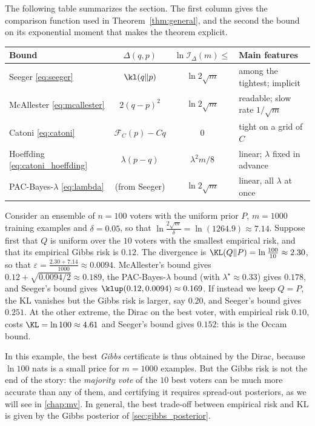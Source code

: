 The following table summarizes the section. The first column gives the
comparison function used in Theorem~\ref{thm:general}, and the second the bound
on its exponential moment that makes the theorem explicit.

\begin{center}
\renewcommand{\arraystretch}{1.3}
\small
\begin{tabular}{lccp{4.2cm}}
\toprule
Bound & $\Delta(q,p)$ & $\ln\mathcal I_\Delta(m)\leq$ & Main features \\
\midrule
Seeger \eqref{eq:seeger} & $\kl(q\|p)$ & $\ln 2\sqrt m$ & among the tightest; implicit \\
McAllester \eqref{eq:mcallester} & $2(q-p)^2$ & $\ln 2\sqrt m$ & readable; slow rate $1/\sqrt m$ \\
Catoni \eqref{eq:catoni} & $\mathcal F_C(p)-Cq$ & $0$ & tight on a grid of $C$ \\
Hoeffding \eqref{eq:catoni_hoeffding} & $\lambda(p-q)$ & $\lambda^2m/8$ & linear; $\lambda$ fixed in advance \\
PAC-Bayes-$\lambda$ \eqref{eq:lambda} & (from Seeger) & $\ln 2\sqrt m$ & linear, all $\lambda$ at once \\
\bottomrule
\end{tabular}
\end{center}

\begin{example}
Consider an ensemble of $n=100$ voters with the uniform prior $P$, $m=1000$ training
examples and $\delta=0.05$, so that $\ln\frac{2\sqrt m}{\delta}=\ln(1264.9)\approx7.14$.
Suppose first that $Q$ is uniform over the $10$ voters with the smallest
empirical risk, and that its empirical Gibbs risk is $0.12$. The divergence is
$\KL(Q\|P)=\ln\frac{100}{10}\approx2.30$, so that
$\varepsilon=\frac{2.30+7.14}{1000}\approx0.0094$. McAllester's bound gives
$0.12+\sqrt{0.0094/2}\approx0.189$, the PAC-Bayes-$\lambda$ bound (with
$\lambda^\star\approx0.33$) gives $0.178$, and Seeger's bound gives
$\klup(0.12,0.0094)\approx0.169$. If instead we keep $Q=P$, the KL vanishes but
the Gibbs risk is larger, say $0.20$, and Seeger's bound gives $0.251$. At the
other extreme, the Dirac on the best voter, with empirical risk $0.10$, costs
$\KL=\ln100\approx4.61$ and Seeger's bound gives $0.152$: this is the Occam bound.

In this example, the best \emph{Gibbs} certificate is thus obtained by the
Dirac, because $\ln100$ nats is a small price for $m=1000$ examples. But the
Gibbs risk is not the end of the story: the \emph{majority vote} of the $10$ best
voters can be much more accurate than any of them, and certifying it requires
spread-out posteriors, as we will see in \cref{chap:mv}. In general, the best
trade-off between empirical risk and KL is given by the Gibbs posterior of
\cref{sec:gibbs_posterior}.
\end{example}

